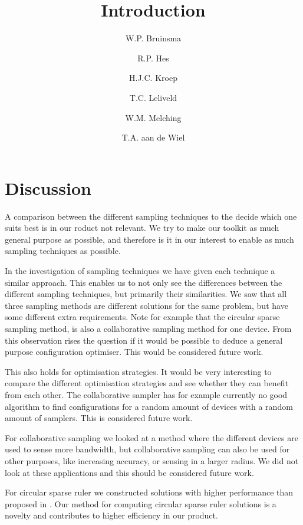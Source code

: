 \documentclass[a4paper, openany, oneside]{memoir}
\title{Introduction}
\author{W.P. Bruinsma \and R.P. Hes \and H.J.C. Kroep \and T.C. Leliveld \and W.M. Melching \and T.A. aan de Wiel}
\begin{document}
\section{Discussion}

A comparison between the different sampling techniques to the decide which one suits best is in our roduct not relevant. We try to make our toolkit as much general purpose as possible, and therefore is it in our interest to enable as much sampling techniques as possible.

In the investigation of sampling techniques we have given each technique a similar approach. This enables us to not only see the differences between the different sampling techniques, but primarily their similarities. We saw that all three sampling methods are different solutions for the same problem, but have some different extra requirements. Note for example that the circular sparse sampling method, is also a collaborative sampling method for one device. From this observation rises the question if it would be possible to deduce a  general purpose configuration optimiser. This would be considered future work.  

This also holds for optimisation strategies. It would be very interesting to compare the different optimisation strategies and see whether they can benefit from each other. The collaborative sampler has for example currently no good algorithm to find configurations for a random amount of devices with a random amount of samplers. This is considered future work.

For collaborative sampling we looked at a method where the different devices are used to sense more bandwidth, but collaborative sampling can also be used for other purposes, like increasing accuracy, or sensing in a larger radius. We did not look at these applications and this should be considered future work.

For circular sparse ruler we constructed solutions with higher performance than proposed in \cite{ariananda2012compressive}. Our method for computing circular sparse ruler solutions is a novelty and contributes to higher efficiency in our product.
\end{document}

